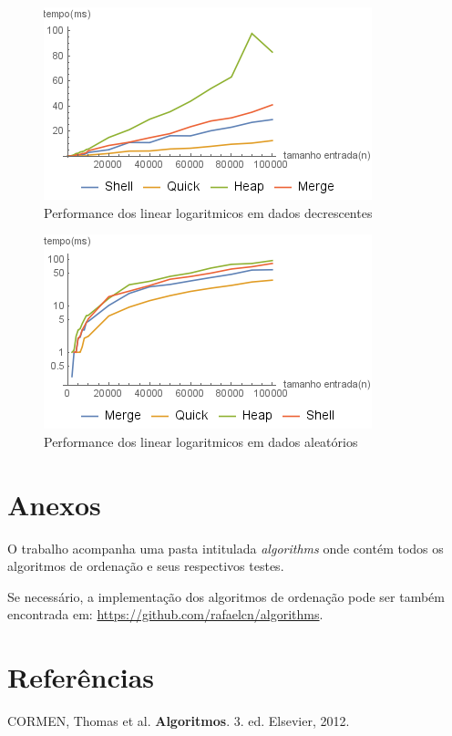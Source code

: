 \documentclass[a4paper, 12pt]{report}
\begin{document}
\begin{figure}[htb]
\centering
\includegraphics[width=.9\linewidth]{./img/logarithmic_decrescent.png}
\caption{\small Performance dos linear logaritmicos em dados decrescentes}
\end{figure}

\begin{figure}[htb]
\centering
\includegraphics[width=.9\linewidth]{./img/logarithmic_random.png}
\caption{\small Performance dos linear logaritmicos em dados aleatórios}
\end{figure}

\part{Anexos}
\label{sec-5}
O trabalho acompanha uma pasta intitulada \emph{algorithms} onde contém todos os
algoritmos de ordenação e seus respectivos testes.

Se necessário, a implementação dos algoritmos de ordenação pode ser também
encontrada em: \url{https://github.com/rafaelcn/algorithms}.

\part{Referências}
\label{sec-6}
\noindent
CORMEN, Thomas et al. \textbf{Algoritmos}. 3. ed. Elsevier, 2012.
\end{document}

